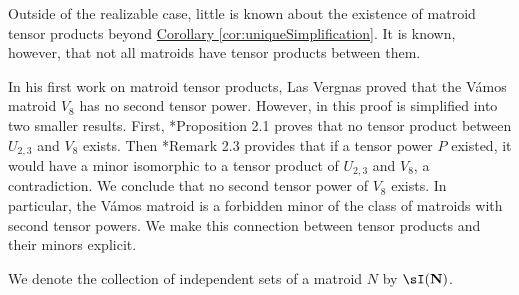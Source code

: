     Outside of the realizable case, little is known about the existence of matroid tensor products beyond \hyperref[cor:uniqueSimplification]{Corollary \ref*{cor:uniqueSimplification}}. It is known, however, that not all matroids have tensor products between them. 
    
    In his first work on matroid tensor products, Las Vergnas proved that the V\'amos matroid $V_8$ has no second tensor power. However, in \cite{LV81} this proof is simplified into two smaller results. First, \cite{LV81}*{Proposition 2.1} proves that no tensor product between $U_{2,3}$ and $V_8$ exists. Then \cite{LV81}*{Remark 2.3} provides that if a tensor power $P$ existed, it would have a minor isomorphic to a tensor product of $U_{2,3}$ and $V_8$, a contradiction. We conclude that no second tensor power of $V_8$ exists. In particular, the V\'amos matroid is a forbidden minor of the class of matroids with second tensor powers. We make this connection between tensor products and their minors explicit.

    We denote the collection of independent sets of a matroid $N$ by $\mathbf{\sI(N)}$.

